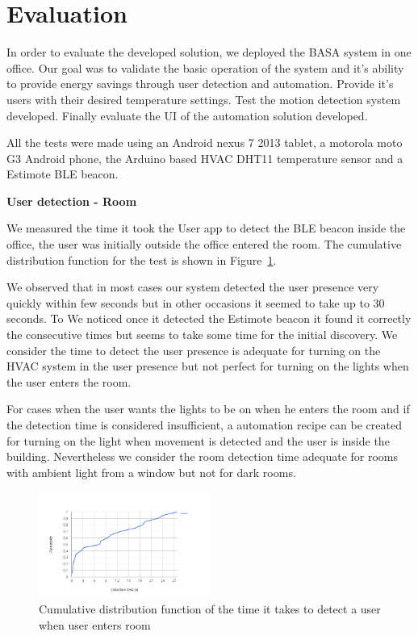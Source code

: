 \documentclass[conference]{IEEEtran}
\begin{document}
\section{Evaluation}

In order to evaluate the developed solution, we deployed the BASA system in one office. Our goal was to validate the basic operation  of the system and it's ability to provide energy savings through user detection and automation. Provide it's users with their desired temperature settings. Test the motion detection system developed. Finally evaluate the \ac{UI} of the automation solution developed.

All the tests were made using an Android nexus 7 2013 tablet, a motorola moto G3 Android phone, the Arduino based HVAC DHT11 temperature sensor and a Estimote BLE beacon.

\textbf{User detection - Room}

We measured the time it took the User app to detect the BLE beacon inside the office, the user was initially outside the office entered the room. The cumulative distribution function for the test is shown in Figure~\ref{eval:room2}.

We observed that in most cases our system detected the user presence very quickly within few seconds but in other occasions it seemed to take up to 30 seconds. To We noticed once it detected the Estimote beacon it found it correctly the consecutive times but seems to take some time for the initial discovery. We consider the time to detect the user presence is adequate for turning on the \ac{HVAC} system in the user presence but not perfect for turning on the lights when the user enters the room.

For cases when the user wants the lights to be on when he enters the room and if the detection time is considered insufficient, a automation recipe can be created for turning on the light when movement is detected and the user is inside the building. Nevertheless we consider the room detection time adequate for rooms with ambient light from a window but not for dark rooms.


\begin{figure}[]
\centering
\includegraphics[width=0.5\textwidth]{Figures/room_detection_cumulative2}
\caption{Cumulative distribution function of the time it takes to detect a user when user enters room}
\label{eval:room2}
\end{figure}
\end{document}
